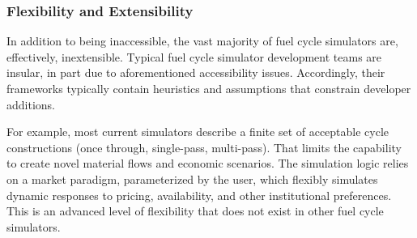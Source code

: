 \subsubsection{Flexibility and Extensibility}

In addition to being inaccessible, the vast majority of fuel cycle simulators
are, effectively, inextensible. Typical fuel cycle simulator development teams are insular, in
part due to aforementioned accessibility issues. Accordingly, their frameworks
typically contain heuristics and assumptions that constrain developer additions.

For example, most current simulators describe a finite set of acceptable
cycle constructions (once through, single-pass, multi-pass). That limits the
capability to create novel material flows and economic scenarios. The \Cyclus
simulation logic relies on a market paradigm, parameterized by the user, which
flexibly simulates dynamic responses to pricing, availability, and other
institutional preferences. This is an advanced level of flexibility that does
not exist in other fuel cycle simulators.
